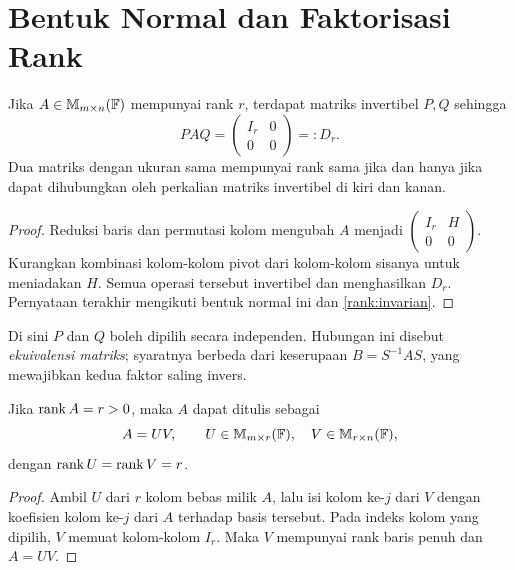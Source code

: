 \section{Bentuk Normal dan Faktorisasi Rank}
\label{rank:faktorisasi}

\begin{teorema}
    Jika $A\in\mathbb{M}_{m\times n}(\mathbb{F})$ mempunyai rank $r$, terdapat matriks
    invertibel $P,Q$ sehingga
    \[
        PAQ=\begin{pmatrix}I_r&0\\0&0\end{pmatrix}=:D_r.
    \]
    Dua matriks dengan ukuran sama mempunyai rank sama jika dan hanya
    jika dapat dihubungkan oleh perkalian matriks invertibel di kiri dan kanan.
\end{teorema}
\begin{proof}
    Reduksi baris dan permutasi kolom mengubah $A$ menjadi
    $\begin{pmatrix}I_r&H\\0&0\end{pmatrix}$.
    Kurangkan kombinasi kolom-kolom pivot dari kolom-kolom sisanya untuk
    meniadakan $H$. Semua operasi tersebut invertibel dan menghasilkan
    $D_r$. Pernyataan terakhir mengikuti bentuk normal ini dan
    \autoref{rank:invarian}.
\end{proof}

Di sini $P$ dan $Q$ boleh dipilih secara independen. Hubungan ini disebut
\emph{ekuivalensi matriks}; syaratnya berbeda dari keserupaan
$B=S^{-1}AS$, yang mewajibkan kedua faktor saling invers.

\begin{teorema}
    Jika $\operatorname{rank} A=r>0$, maka $A$ dapat ditulis sebagai
    \[
        A=UV,\qquad U\in\mathbb{M}_{m\times r}(\mathbb{F}),\quad
        V\in\mathbb{M}_{r\times n}(\mathbb{F}),
    \]
    dengan $\operatorname{rank} U=\operatorname{rank} V=r$.
\end{teorema}
\begin{proof}
    Ambil $U$ dari $r$ kolom bebas milik $A$, lalu isi kolom ke-$j$ dari
    $V$ dengan koefisien kolom ke-$j$ dari $A$ terhadap basis tersebut.
    Pada indeks kolom yang dipilih, $V$ memuat kolom-kolom $I_r$.
    Maka $V$ mempunyai rank baris penuh dan $A=UV$.
\end{proof}


